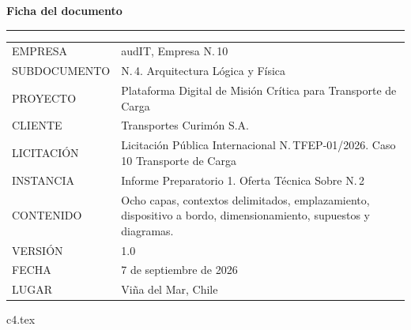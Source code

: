 \documentclass[12pt, letterpaper, table, xcdraw]{inf-pucv}
\begin{document}

\thispagestyle{empty}
\vspace*{1.2cm}
{\color{audITnavy}\fontsize{28}{32}\selectfont\bfseries Ficha del documento}

\vspace{10pt}
{\color{audITteal}\rule{\linewidth}{2pt}}

\vspace{22pt}
{\small
\begin{longtable}{@{}p{3.5cm}p{10.5cm}@{}}
\color{audITgris}EMPRESA & \color{black}audIT, Empresa N.\textordmasculine{}\,10 \\
\color{audITgris}SUBDOCUMENTO & \color{black}N.\textordmasculine{}\,4. Arquitectura Lógica y Física \\
\color{audITgris}PROYECTO & \color{black}Plataforma Digital de Misión Crítica para Transporte de Carga \\
\color{audITgris}CLIENTE & \color{black}Transportes Curimón S.A. \\
\color{audITgris}LICITACIÓN & \color{black}Licitación Pública Internacional N.\textordmasculine{}\,TFEP-01/2026. Caso 10 Transporte de Carga \\
\color{audITgris}INSTANCIA & \color{black}Informe Preparatorio 1. Oferta Técnica Sobre N.\textordmasculine{}\,2 \\
\color{audITgris}CONTENIDO & \color{black}Ocho capas, contextos delimitados, emplazamiento, dispositivo a bordo, dimensionamiento, supuestos y diagramas. \\
\color{audITgris}VERSIÓN & \color{black}1.0 \\
\color{audITgris}FECHA & \color{black}7 de septiembre de 2026 \\
\color{audITgris}LUGAR & \color{black}Viña del Mar, Chile \\
\end{longtable}}
\clearpage

\setcounter{page}{1}
\renewcommand{\contentsname}{Índice}
\tableofcontents
\clearpage

{c4.tex}

\clearpage
{}
{}
\printbibliography[title={Bibliografía}]
\end{document}
